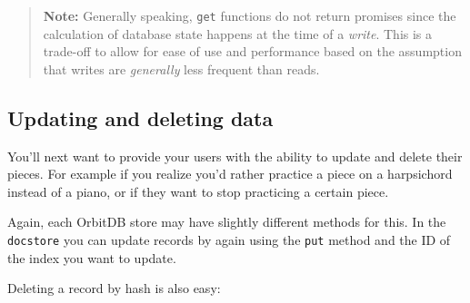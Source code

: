 \begin{quote}
\textbf{Note:} Generally speaking, \texttt{get} functions do not return
promises since the calculation of database state happens at the time of
a \emph{write}. This is a trade-off to allow for ease of use and
performance based on the assumption that writes are \emph{generally}
less frequent than reads.
\end{quote}

\hypertarget{updating-and-deleting-data}{\subsection{Updating and
deleting data}\label{updating-and-deleting-data}}

You'll next want to provide your users with the ability to update and
delete their pieces. For example if you realize you'd rather practice a
piece on a harpsichord instead of a piano, or if they want to stop
practicing a certain piece.

Again, each OrbitDB store may have slightly different methods for this.
In the \texttt{docstore} you can update records by again using the
\texttt{put} method and the ID of the index you want to update.

\begin{Shaded}
\begin{Highlighting}[]
\OperatorTok{,}\OperatorTok{=} \NormalTok{) }\OperatorTok{\{}
  \OperatorTok{=}
   \OperatorTok{=}
  \OperatorTok{=}
\OperatorTok{\}}
\end{Highlighting}
\end{Shaded}

Deleting a record by hash is also easy:

\begin{Shaded}
\begin{Highlighting}[]
\OperatorTok{\{}
  \OperatorTok{=}
\OperatorTok{\}}
\end{Highlighting}
\end{Shaded}

